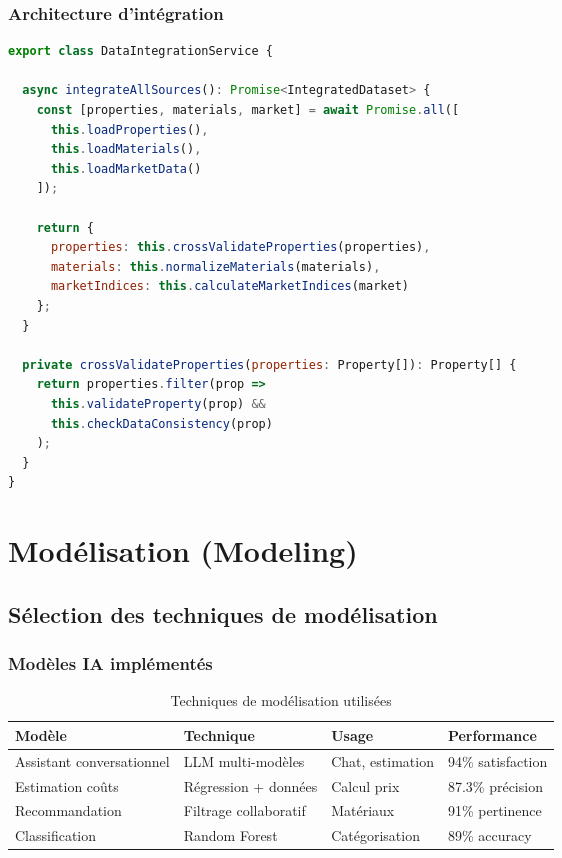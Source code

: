 \documentclass[12pt,a4paper]{report}
\begin{document}
\subsection{Architecture d'intégration}

\begin{lstlisting}[caption=Service d'intégration des données, language=javascript]
export class DataIntegrationService {
  
  async integrateAllSources(): Promise<IntegratedDataset> {
    const [properties, materials, market] = await Promise.all([
      this.loadProperties(),
      this.loadMaterials(), 
      this.loadMarketData()
    ]);
    
    return {
      properties: this.crossValidateProperties(properties),
      materials: this.normalizeMaterials(materials),
      marketIndices: this.calculateMarketIndices(market)
    };
  }
  
  private crossValidateProperties(properties: Property[]): Property[] {
    return properties.filter(prop => 
      this.validateProperty(prop) && 
      this.checkDataConsistency(prop)
    );
  }
}
\end{lstlisting}

\chapter{Modélisation (Modeling)}

\section{Sélection des techniques de modélisation}

\subsection{Modèles IA implémentés}

\begin{table}[H]
    \centering
    \caption{Techniques de modélisation utilisées}
    \begin{tabular}{|l|l|l|l|}
        \hline
        \textbf{Modèle} & \textbf{Technique} & \textbf{Usage} & \textbf{Performance} \\
        \hline
        Assistant conversationnel & LLM multi-modèles & Chat, estimation & 94\% satisfaction \\
        \hline
        Estimation coûts & Régression + données & Calcul prix & 87.3\% précision \\
        \hline
        Recommandation & Filtrage collaboratif & Matériaux & 91\% pertinence \\
        \hline
        Classification & Random Forest & Catégorisation & 89\% accuracy \\
        \hline
    \end{tabular}
\end{table}
\end{document}

